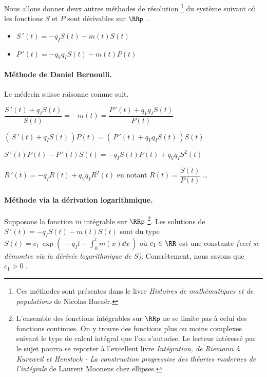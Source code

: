 Nous allons donner deux autres méthodes de résolution
\footnote{
	Ces méthodes sont présentes dans le livre \emph{\og Histoires de mathématiques et de populations \fg} de Nicolas Bacaër. 
}
du système suivant où les fonctions $S$ et $P$ sont dérivables sur $\RRp$ .

\begin{itemize}[label=\small\textbullet]
	\item $S\,'(t) = - q_I S(t) - m(t) S(t)$

	\item $P\,'(t) = - q_V q_I S(t) - m(t) P(t)$
\end{itemize}




\paragraph{Méthode de Daniel Bernoulli.} Le médecin suisse raisonne comme suit.

\bigskip

$\dfrac{S\,'(t) + q_I S(t)}{S(t)} = - m(t) = \dfrac{P\,'(t) + q_V q_I S(t)}{P(t)}$

\medskip

$\left( \, S\,'(t) + q_I S(t) \, \right) P(t) = \left( \, P\,'(t) + q_V q_I S(t) \, \right) S(t)$

\bigskip

$S\,'(t) P(t) - P\,'(t) S(t) = - q_I S(t) P(t) + q_V q_I S^2(t)$

\medskip

$R\,'(t) = - q_I R(t) + q_V q_I R^2(t)$ en notant $R(t) = \dfrac{S(t)}{P(t)}$ \dots





\paragraph{Méthode via la dérivation logarithmique.} Supposons la fonction $m$ intégrable sur $\RRp$
\footnote{
	L'ensemble des fonctions intégrables sur $\RRp$ ne se limite pas à celui des fonctions continues. On y trouve des fonctions plus ou moins complexes suivant le type de calcul intégral que l'on s'autorise. Le lecteur intéressé par le sujet pourra se reporter à l'excellent livre \emph{\og Intégration, de Riemann à Kurzweil et Henstock - La construction progressive des théories modernes de l'intégrale \fg} de Laurent Moonens chez ellipses. 
}.
Les solutions de $S\,'(t) = - q_I S(t) - m(t) S(t)$ sont du type $\displaystyle S(t) = c_1 \, \exp \left( \, - q_I t - \int_0^t m(x) \dd{x} \, \right)$ où $c_1 \in \RR$ est une constante \emph{(ceci se démontre via la dérivée logarithmique de $S$)}. Concrètement, nous savons que $c_1 > 0$ .

